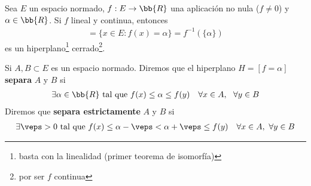 \begin{observacion}
    Sea $E$ un espacio normado, $f:E\to \bb{R}$ una aplicación no nula ($f\neq 0$) y $\alpha \in \bb{R}$. Si $f$ lineal y continua, entonces
    \begin{gather*}
        [f=\alpha] = \{x\in E : f(x)=\alpha\} = f^{-1}(\{\alpha\})
    \end{gather*} es un hiperplano\footnote{basta con la linealidad (primer teorema de isomorfía)} cerrado\footnote{por ser $f$ continua}.
\end{observacion}

\begin{definicion}
    Si $A,B\subset E$ es un espacio normado. Diremos que el hiperplano $H=[f=\alpha]$ \textbf{separa} $A$ y $B$ si 
    \begin{gather*}
        \exists \alpha \in \bb{R} \text{ tal que } f(x) \leq \alpha \leq f(y)\ \ \ \forall x \in A,\ \ \forall y \in B
    \end{gather*}
    Diremos que \textbf{separa estrictamente} $A$ y $B$ si 
    \begin{gather*}
        \exists \veps > 0 \text{ tal que } f(x)\leq \alpha -\veps < \alpha + \veps \leq f(y)\ \ \ \forall x \in A,\ \forall y \in B
    \end{gather*}
\end{definicion}

